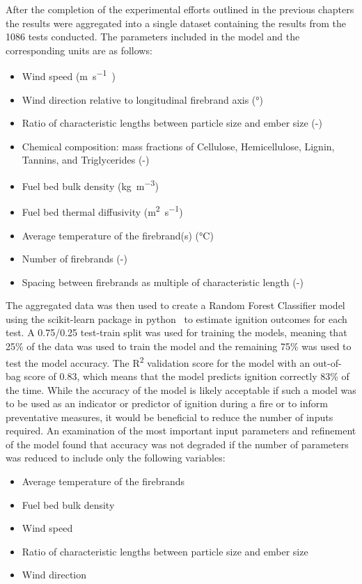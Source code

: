     After the completion of the experimental efforts outlined in the previous chapters the results were aggregated into a single dataset containing the results from the 1086 tests conducted. The parameters included in the model and the corresponding units are as follows:
        \begin{itemize}
            \item Wind speed (\si{\meter\per\second)}
            \item Wind direction relative to longitudinal firebrand axis (\si{\degree})
            \item Ratio of characteristic lengths between particle size and ember size (-)
            \item Chemical composition: mass fractions of Cellulose, Hemicellulose, Lignin, Tannins, and Triglycerides (-)
            \item Fuel bed bulk density (\si{\kilo\gram\per\cubic\meter})
            \item Fuel bed thermal diffusivity (\si{\square\meter\per\second})
            \item Average temperature of the firebrand(s) (\si{\celsius})
            \item Number of firebrands (-)
            \item Spacing between firebrands as multiple of characteristic length (-)
        \end{itemize}
    The aggregated data was then used to create a Random Forest Classifier model using the scikit-learn package in python~\cite{scikit-learn} to estimate ignition outcomes for each test. A 0.75/0.25 test-train split was used for training the models, meaning that 25\% of the data was used to train the model and the remaining 75\% was used to test the model accuracy. The R\textsuperscript{2} validation score for the model with an out-of-bag score of 0.83, which means that the model predicts ignition correctly 83\% of the time. While the accuracy of the model is likely acceptable if such a model was to be used as an indicator or predictor of ignition during a fire or to inform preventative measures, it would be beneficial to reduce the number of inputs required. An examination of the most important input parameters and refinement of the model found that accuracy was not degraded if the number of parameters was reduced to include only the following variables:
        \begin{itemize}
            \item Average temperature of the firebrands
            \item Fuel bed bulk density
            \item Wind speed
            \item Ratio of characteristic lengths between particle size and ember size
            \item Wind direction
        \end{itemize}
